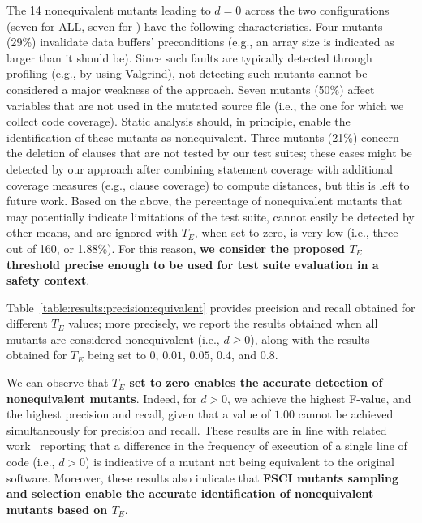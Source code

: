 The 14 nonequivalent mutants leading to $d=0$ across the two configurations (seven for ALL, seven for \APPR) have the following characteristics.
Four mutants (29\%) invalidate data buffers' preconditions (e.g., an array size is indicated as larger than it should be). Since such faults are typically detected through profiling (e.g., by using Valgrind), not detecting such mutants cannot be considered a major weakness of the approach. Seven mutants (50\%) affect variables that are not used in the mutated source file (i.e., the one for which we collect code coverage). 
Static analysis should, in principle, enable the identification of these mutants as nonequivalent. 
Three mutants (21\%) concern the deletion of clauses that are not tested by our test suites; these cases might be detected by our approach after combining statement coverage with additional coverage measures (e.g., clause coverage) to compute distances, but this is left to future work. Based on the above, the percentage of nonequivalent mutants that
may potentially indicate limitations of the test suite, cannot easily be detected by other means, 
and are ignored with $T_E$, when set to zero, is very low 
 (i.e., three out of 160, or 1.88\%). For this reason, \textbf{we consider the proposed $T_E$ threshold precise enough to be used for test suite evaluation in a safety context}.
 
Table~\ref{table:results:precision:equivalent} provides precision and recall obtained for different $T_E$ values; more precisely, we report the results obtained when all mutants are considered nonequivalent (i.e., $d\ge0$), along with the results obtained for $T_E$ being set to $0$, $0.01$, $0.05$, $0.4$, and $0.8$. 



 We can observe that \textbf{$T_E$ set to zero enables the accurate detection of nonequivalent mutants}. Indeed, 
for $d>0$, we achieve the highest F-value, and the highest precision and recall, given that a value of $1.00$ cannot be achieved simultaneously for precision and recall.
These results are in line with related work~\cite{zhang2013faster} reporting that a difference in the frequency of execution of a single line of code (i.e., $d>0$) is indicative of a mutant not being equivalent to the original software.
Moreover, these results also indicate that \textbf{FSCI mutants sampling and \MPTS selection enable the accurate identification of nonequivalent mutants based on $T_E$}.



